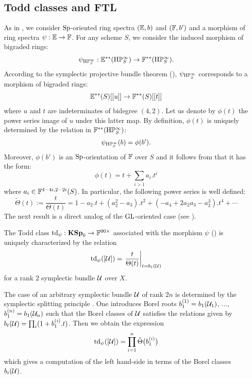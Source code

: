 \subsection{Todd classes and FTL}

\begin{num}
As in ,
 we consider $\mathrm{Sp}$-oriented ring spectra $(\mathbb E,b)$ and $(\mathbb F,b')$
 and a morphism  of ring spectra $\psi:\mathbb E \rightarrow \mathbb F$.
 For any scheme $S$, we consider the induced morphism of bigraded rings:
$$
\psi_{\mathrm{H}\mathbb P^\infty_S}:\mathbb E^{**}(\mathrm{H}\mathbb P^\infty_S) \rightarrow \mathbb F^{**}(\mathrm{H}\mathbb P^\infty_S).
$$
According to the symplectic projective bundle theorem (\cite[Th. 2.2.3]{DF3}), $\psi_{\mathrm{H}\mathbb P^\infty_S}$ corresponds to a morphism of bigraded rings:
$$
\mathbb E^{**}(S)[[u]] \rightarrow \mathbb F^{**}(S)[[t]]
$$
where $u$ and $t$ are indeterminates of bidegree $(4,2)$.
 Let us denote by $\phi(t)$ the power series image of $u$ under this latter map.
 By definition, $\phi(t)$ is uniquely determined by the relation in $\mathbb F^{**}(\mathrm{H}\mathbb P^\infty_S)$:
\begin{equation}
\psi_{\mathrm{H}\mathbb P^\infty_S}(b)=\phi(b').
\end{equation}
Moreover, $\phi(b')$ is an $\mathrm{Sp}$-orientation of $\mathbb F$ over $S$
 and it follows from  that it has the form:
$$
\phi(t)=t+\sum_{i>1} a_i.t^i
$$
where $a_i \in \mathbb F^{4-4i,2-2i}(S)$. 
 In particular, the following power series is well defined:
$$
\tilde \Theta(t):=\frac t {\Theta(t)}=1-a_2.t+(a_2^2-a_3).t^2+(-a_4+2a_2a_3-a^3_2).t^4+ \cdots
$$
The next result is a direct analog of the $\mathrm{GL}$-oriented case
 (see \cite[Prop. 4.1.2]{Deg12}).  
\end{num}

\begin{prop}
The Todd class $\operatorname{td}_\psi:\mathbf{KSp}_0 \rightarrow \mathbb F^{00 \times}$
 associated with the morphism $\psi$ ()
 is uniquely characterized by the relation 
$$
\operatorname{td}_\psi([\mathcal U])=\left. \frac t {\Theta(t)}\right\vert_{t=b_1(\mathcal U)}
$$
for a rank $2$ symplectic bundle $\mathcal U$ over $X$.
\end{prop}
The case of an arbitrary symplectic bundle $\mathcal U$ of rank $2n$ is determined
 by the symplectic splitting principle .
 One introduces Borel roots
 $b_1^{(1)}=b_1(\mathcal U_1)$, ..., $b_1^{(n)}=b_1(\mathcal U_n)$ such that the Borel classes
 of $\mathcal U$ satisfies the relations given by $b_t(\mathcal U)=\prod_i (1+b_1^{(i)}.t)$.
 Then we obtain the expression
$$
\operatorname{td}_\psi([\mathcal U])=\prod_{i=1}^n \tilde \Theta\big(b_1^{(i)}\big)
$$
which gives a computation of the left hand-side in terms of the Borel classes
 $b_i(\mathcal U)$.

